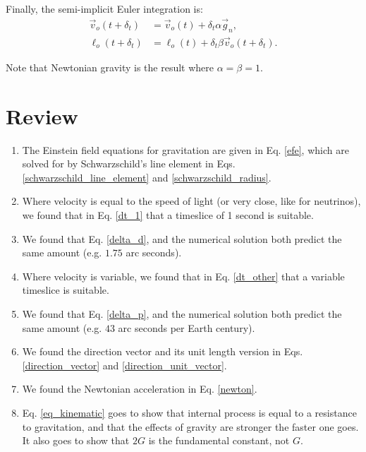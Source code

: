 \documentclass[12pt]{article}
\begin{document}
Finally, the semi-implicit Euler integration is:
\begin{align}
\label{eq_velocity}
\vec{v}_{o}(t + \delta_t) &= \vec{v}_{o}(t) + \delta_{t} \alpha \vec{g}_n, \\
\label{eq_position}
\ell_{o}(t + \delta_t) &= \ell_{o}(t) + \delta_{t} \beta \vec{v}_{o}(t + \delta_t).
\end{align}

Note that Newtonian gravity is the result where $\alpha = \beta = 1$.





\section {Review}

\begin{enumerate}

\item
The Einstein field equations for gravitation are given in Eq. \ref{efe}, which are solved for by Schwarzschild's line element in Eqs. \ref{schwarzschild_line_element} and \ref{schwarzschild_radius}.

\item
Where velocity is equal to the speed of light (or very close, like for neutrinos), we found that in Eq. \ref{dt_1} that a timeslice of 1 second is suitable.

\item
We found that Eq. \ref{delta_d}, and the numerical solution both predict the same amount (e.g. $1.75$ arc seconds).

\item
Where velocity is variable, we found that in Eq. \ref{dt_other} that a variable timeslice is suitable.

\item
We found that Eq. \ref{delta_p}, and the numerical solution both predict the same amount (e.g. $43$ arc seconds per Earth century).

\item
We found the direction vector and its unit length version in Eqs. \ref{direction_vector} and \ref{direction_unit_vector}.

\item
We found the Newtonian acceleration in Eq. \ref{newton}.

\item
Eq. \ref{eq_kinematic} goes to show that internal process is equal to a resistance to gravitation, and that the effects of gravity are stronger the faster one goes.
It also goes to show that $2G$ is the fundamental constant, not $G$.


\end{enumerate}
\end{document}
